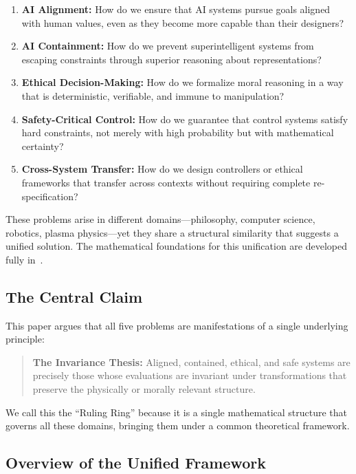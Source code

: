 \documentclass[12pt]{article}
\begin{document}
\begin{enumerate}
    \item \textbf{AI Alignment:} How do we ensure that AI systems pursue goals aligned with human values, even as they become more capable than their designers?

    \item \textbf{AI Containment:} How do we prevent superintelligent systems from escaping constraints through superior reasoning about representations?

    \item \textbf{Ethical Decision-Making:} How do we formalize moral reasoning in a way that is deterministic, verifiable, and immune to manipulation?

    \item \textbf{Safety-Critical Control:} How do we guarantee that control systems satisfy hard constraints, not merely with high probability but with mathematical certainty?

    \item \textbf{Cross-System Transfer:} How do we design controllers or ethical frameworks that transfer across contexts without requiring complete re-specification?
\end{enumerate}

These problems arise in different domains---philosophy, computer science, robotics, plasma physics---yet they share a structural similarity that suggests a unified solution. The mathematical foundations for this unification are developed fully in~\cite{bond2026ge}.

\subsection{The Central Claim}

This paper argues that all five problems are manifestations of a single underlying principle:

\begin{quote}
\textbf{The Invariance Thesis:} Aligned, contained, ethical, and safe systems are precisely those whose evaluations are invariant under transformations that preserve the physically or morally relevant structure.
\end{quote}

We call this the ``Ruling Ring'' because it is a single mathematical structure that governs all these domains, bringing them under a common theoretical framework.

\subsection{Overview of the Unified Framework}
\end{document}
